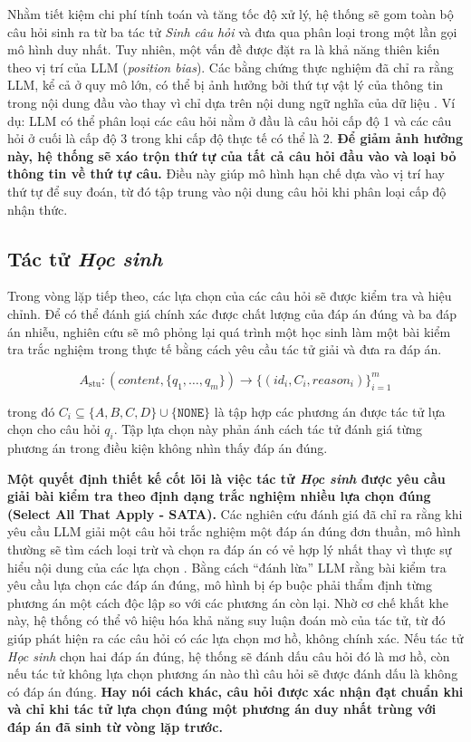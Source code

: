 Nhằm tiết kiệm chi phí tính toán và tăng tốc độ xử lý, hệ thống sẽ gom toàn bộ câu hỏi sinh ra từ ba tác tử \textit{Sinh câu hỏi} và đưa qua phân loại trong một lần gọi mô hình duy nhất. Tuy nhiên, một vấn đề được đặt ra là khả năng thiên kiến theo vị trí của LLM (\textit{position bias}). Các bằng chứng thực nghiệm đã chỉ ra rằng LLM, kể cả ở quy mô lớn, có thể bị ảnh hưởng bởi thứ tự vật lý của thông tin trong nội dung đầu vào thay vì chỉ dựa trên nội dung ngữ nghĩa của dữ liệu \cite{wang2024large}. Ví dụ: LLM có thể phân loại các câu hỏi nằm ở đầu là câu hỏi cấp độ 1 và các câu hỏi ở cuối là cấp độ 3 trong khi cấp độ thực tế có thể là 2. \textbf{Để giảm ảnh hưởng này, hệ thống sẽ xáo trộn thứ tự của tất cả câu hỏi đầu vào và loại bỏ thông tin về thứ tự câu.} Điều này giúp mô hình hạn chế dựa vào vị trí hay thứ tự để suy đoán, từ đó tập trung vào nội dung câu hỏi khi phân loại cấp độ nhận thức.

\subsection{Tác tử \textit{Học sinh}}
Trong vòng lặp tiếp theo, các lựa chọn của các câu hỏi sẽ được kiểm tra và hiệu chỉnh. Để có thể đánh giá chính xác được chất lượng của đáp án đúng và ba đáp án nhiễu, nghiên cứu sẽ mô phỏng lại quá trình một học sinh làm một bài kiểm tra trắc nghiệm trong thực tế bằng cách yêu cầu tác tử giải và đưa ra đáp án.

\begin{equation}
A_{\text{stu}}: (\textit{content}, \{q_1, \ldots, q_m\}) \longrightarrow \{(\textit{id}_i, C_i, \textit{reason}_i)\}_{i=1}^{m}
\end{equation}

\noindent trong đó $C_i \subseteq \{A, B, C, D\} \cup \{\texttt{NONE}\}$ là tập hợp các phương án được tác tử lựa chọn cho câu hỏi $q_i$. Tập lựa chọn này phản ánh cách tác tử đánh giá từng phương án trong điều kiện không nhìn thấy đáp án đúng.

\textbf{Một quyết định thiết kế cốt lõi là việc tác tử \textit{Học sinh} được yêu cầu giải bài kiểm tra theo định dạng trắc nghiệm nhiều lựa chọn đúng (Select All That Apply - SATA).} Các nghiên cứu đánh giá đã chỉ ra rằng khi yêu cầu LLM giải một câu hỏi trắc nghiệm một đáp án đúng đơn thuần, mô hình thường sẽ tìm cách loại trừ và chọn ra đáp án có vẻ hợp lý nhất thay vì thực sự hiểu nội dung của các lựa chọn \cite{xu2025satabench}. Bằng cách ``đánh lừa'' LLM rằng bài kiểm tra yêu cầu lựa chọn các đáp án đúng, mô hình bị ép buộc phải thẩm định từng phương án một cách độc lập so với các phương án còn lại. Nhờ cơ chế khắt khe này, hệ thống có thể vô hiệu hóa khả năng suy luận đoán mò của tác tử, từ đó giúp phát hiện ra các câu hỏi có các lựa chọn mơ hồ, không chính xác. Nếu tác tử \textit{Học sinh} chọn hai đáp án đúng, hệ thống sẽ đánh dấu câu hỏi đó là mơ hồ, còn nếu tác tử không lựa chọn phương án nào thì câu hỏi sẽ được đánh dấu là không có đáp án đúng. \textbf{Hay nói cách khác, câu hỏi được xác nhận đạt chuẩn khi và chỉ khi tác tử lựa chọn đúng một phương án duy nhất trùng với đáp án đã sinh từ vòng lặp trước.}

